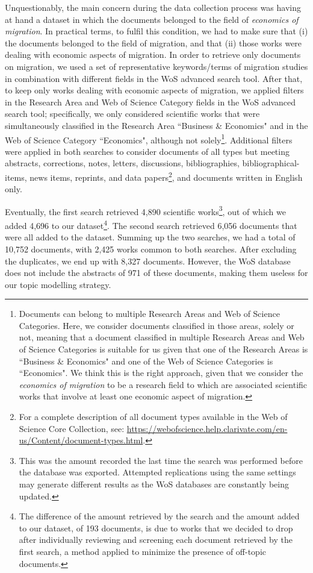 Unquestionably, the main concern during the data collection process was having at hand a dataset in which the documents belonged to the field of \textit{economics of migration}. In practical terms, to fulfil this condition, we had to make sure that (i) the documents belonged to the field of migration, and that (ii) those works were dealing with economic aspects of migration. In order to retrieve only documents on migration, we used a set of representative keywords/terms of migration studies in combination with different fields in the WoS advanced search tool. After that, to keep only works dealing with economic aspects of migration, we applied filters in the Research Area and Web of Science Category fields in the WoS advanced search tool; specifically, we only considered scientific works that were simultaneously classified in the Research Area ``Business \& Economics" and in the Web of Science Category ``Economics", although not solely\footnote{Documents can belong to multiple Research Areas and Web of Science Categories. Here, we consider documents classified in those areas, solely or not, meaning that a document classified in multiple Research Areas and Web of Science Categories is suitable for us given that one of the Research Areas is ``Business \& Economics" and one of the Web of Science Categories is ``Economics". We think this is the right approach, given that we consider the \textit{economics of migration} to be a research field to which are associated scientific works that involve at least one economic aspect of migration.}.  Additional filters were applied in both searches to consider documents of all types but meeting abstracts, corrections, notes, letters, discussions, bibliographies, bibliographical-items, news items, reprints, and data papers\footnote{For a complete description of all document types available in the Web of Science Core Collection, see: \url{https://webofscience.help.clarivate.com/en-us/Content/document-types.html}.}, and documents written in English only.

Eventually, the first search retrieved 4,890 scientific works\footnote{This was the amount recorded the last time the search was performed before the database was exported. Attempted replications using the same settings may generate different results as the WoS databases are constantly being updated.}, out of which we added 4,696 to our dataset\footnote{The difference of the amount retrieved by the search and the amount added to our dataset, of 193 documents, is due to works that we decided to drop after individually reviewing and screening each document retrieved by the first search, a method applied to minimize the presence of off-topic documents.}. The second search retrieved 6,056 documents that were all added to the dataset. Summing up the two searches, we had a total of 10,752 documents, with 2,425 works common to both searches. After excluding the duplicates, we end up with 8,327 documents. However, the WoS database does not include the abstracts of 971 of these documents, making them useless for our topic modelling strategy.

